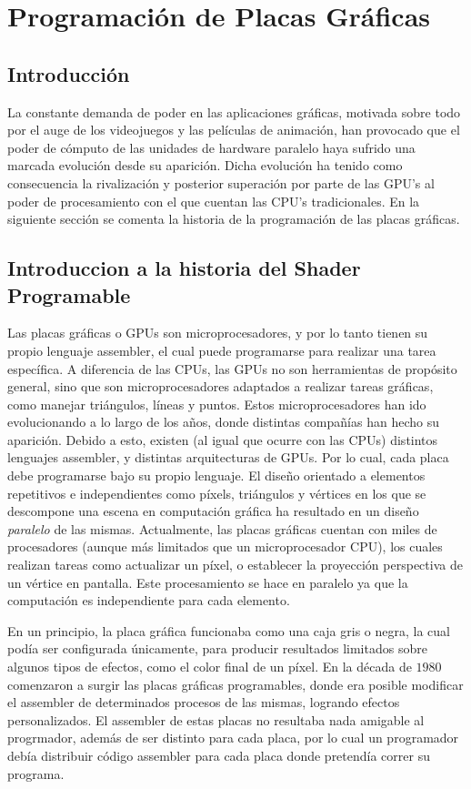 \chapter{Programación de Placas Gráficas}

\section{Introducci\'on}
La constante demanda de poder en las aplicaciones gr\'aficas, motivada sobre todo por el auge de los videojuegos y las películas de animación, han provocado que el poder de cómputo de las unidades de hardware paralelo haya sufrido una marcada evoluci\'on desde su aparici\'on.
Dicha evoluci\'on ha tenido como consecuencia la rivalizaci\'on y posterior superaci\'on por parte de las GPU's al poder de procesamiento con el que cuentan las CPU's tradicionales\cite{Harris06}.
En la siguiente sección se comenta la historia de la programación de las placas gráficas.

\section{Introduccion a la historia del Shader Programable}
Las placas gráficas o GPUs son microprocesadores, y por lo tanto tienen su propio lenguaje assembler, el cual puede programarse para realizar una tarea específica.
A diferencia de las CPUs, las GPUs no son herramientas de propósito general, sino que son microprocesadores adaptados a realizar tareas gráficas, como manejar triángulos, líneas y puntos.
Estos microprocesadores han ido evolucionando a lo largo de los años, donde distintas compañías han hecho su aparición.
Debido a esto, existen (al igual que ocurre con las CPUs) distintos lenguajes assembler, y distintas arquitecturas de GPUs.
Por lo cual, cada placa debe programarse bajo su propio lenguaje.
El diseño orientado a elementos repetitivos e independientes como píxels, triángulos y vértices en los que se descompone una escena en computación gráfica ha resultado en un diseño {\em paralelo} de las mismas.
Actualmente, las placas gráficas cuentan con miles de procesadores (aunque más limitados que un microprocesador CPU), los cuales realizan tareas como actualizar un píxel, o establecer la proyección perspectiva de un vértice en pantalla.
Este procesamiento se hace en paralelo ya que la computación es independiente para cada elemento.

En un principio, la placa gráfica funcionaba como una caja gris o negra, la cual podía ser configurada únicamente, para producir resultados limitados sobre algunos tipos de efectos, como el color final de un píxel.
En la década de $1980$ comenzaron a surgir las placas gráficas programables, donde era posible modificar el assembler de determinados procesos de las mismas, logrando efectos personalizados.
El assembler de estas placas no resultaba nada amigable al progrmador, además de ser distinto para cada placa, por lo cual un programador debía distribuir código assembler para cada placa donde pretendía correr su programa.

